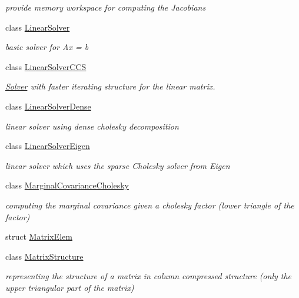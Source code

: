 \begin{DoxyCompactItemize}
\begin{DoxyCompactList}\small\item\em provide memory workspace for computing the Jacobians \end{DoxyCompactList}\item 
class \mbox{\hyperlink{classg2o_1_1_linear_solver}{Linear\+Solver}}
\begin{DoxyCompactList}\small\item\em basic solver for Ax = b \end{DoxyCompactList}\item 
class \mbox{\hyperlink{classg2o_1_1_linear_solver_c_c_s}{Linear\+Solver\+C\+CS}}
\begin{DoxyCompactList}\small\item\em \mbox{\hyperlink{classg2o_1_1_solver}{Solver}} with faster iterating structure for the linear matrix. \end{DoxyCompactList}\item 
class \mbox{\hyperlink{classg2o_1_1_linear_solver_dense}{Linear\+Solver\+Dense}}
\begin{DoxyCompactList}\small\item\em linear solver using dense cholesky decomposition \end{DoxyCompactList}\item 
class \mbox{\hyperlink{classg2o_1_1_linear_solver_eigen}{Linear\+Solver\+Eigen}}
\begin{DoxyCompactList}\small\item\em linear solver which uses the sparse Cholesky solver from Eigen \end{DoxyCompactList}\item 
class \mbox{\hyperlink{classg2o_1_1_marginal_covariance_cholesky}{Marginal\+Covariance\+Cholesky}}
\begin{DoxyCompactList}\small\item\em computing the marginal covariance given a cholesky factor (lower triangle of the factor) \end{DoxyCompactList}\item 
struct \mbox{\hyperlink{structg2o_1_1_matrix_elem}{Matrix\+Elem}}
\item 
class \mbox{\hyperlink{classg2o_1_1_matrix_structure}{Matrix\+Structure}}
\begin{DoxyCompactList}\small\item\em representing the structure of a matrix in column compressed structure (only the upper triangular part of the matrix) \end{DoxyCompactList}\item 

\end{DoxyCompactItemize}
